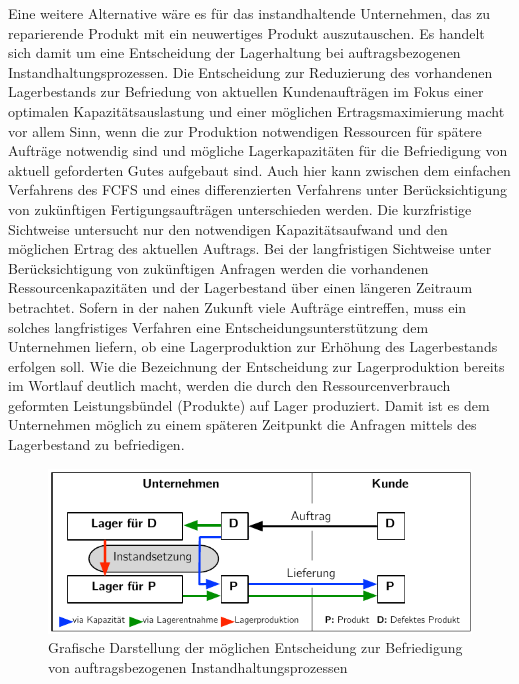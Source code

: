 Eine weitere Alternative wäre es für das instandhaltende Unternehmen, das zu reparierende Produkt mit ein neuwertiges Produkt auszutauschen. Es handelt sich damit um eine Entscheidung der Lagerhaltung bei auftragsbezogenen Instandhaltungsprozessen. Die Entscheidung zur Reduzierung des vorhandenen Lagerbestands zur Befriedung von aktuellen Kundenaufträgen im Fokus einer optimalen Kapazitätsauslastung und einer möglichen Ertragsmaximierung macht vor allem Sinn, wenn die zur Produktion notwendigen Ressourcen für spätere Aufträge notwendig sind und mögliche Lagerkapazitäten für die Befriedigung von aktuell geforderten Gutes aufgebaut sind. Auch hier kann zwischen dem einfachen Verfahrens des FCFS und eines differenzierten Verfahrens unter Berücksichtigung von zukünftigen Fertigungsaufträgen unterschieden werden. Die kurzfristige Sichtweise untersucht nur den notwendigen Kapazitätsaufwand und den möglichen Ertrag des aktuellen Auftrags. Bei der langfristigen Sichtweise unter Berücksichtigung von zukünftigen Anfragen werden die vorhandenen Ressourcenkapazitäten und der Lagerbestand über einen längeren Zeitraum betrachtet. Sofern in der nahen Zukunft viele Aufträge eintreffen, muss ein solches langfristiges Verfahren eine Entscheidungsunterstützung dem Unternehmen liefern, ob eine Lagerproduktion zur Erhöhung des Lagerbestands erfolgen soll. Wie die Bezeichnung der Entscheidung zur Lagerproduktion bereits im Wortlauf deutlich macht, werden die durch den Ressourcenverbrauch geformten Leistungsbündel (Produkte) auf Lager produziert. Damit ist es dem Unternehmen möglich zu einem späteren Zeitpunkt die Anfragen mittels des Lagerbestand zu befriedigen.

\begin{figure}[h!]
  \begin{center}
    \includegraphics[width=120mm]{Bilder/Konzept.pdf}
    \caption{Grafische Darstellung der möglichen Entscheidung zur Befriedigung von auftragsbezogenen Instandhaltungsprozessen}  \label{Konzept}
  \end{center}
\end{figure}

